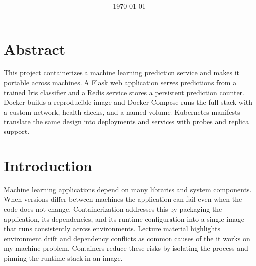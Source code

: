 \usepackage{listings}








\author[\lname]{\fname\ \lname \and \partner}
\date{\today}
\title[\assgn]{\assgn \\ \ \\\class}
\maketitle
\tableofcontents

\newpage

\section{Abstract}
This project containerizes a machine learning prediction service and makes it portable across machines. A Flask web application serves predictions from a trained Iris classifier and a Redis service stores a persistent prediction counter. Docker builds a reproducible image and Docker Compose runs the full stack with a custom network, health checks, and a named volume. Kubernetes manifests translate the same design into deployments and services with probes and replica support.

\section{Introduction}
Machine learning applications depend on many libraries and system components. When versions differ between machines the application can fail even when the code does not change. Containerization addresses this by packaging the application, its dependencies, and its runtime configuration into a single image that runs consistently across environments. Lecture material highlights environment drift and dependency conflicts as common causes of the it works on my machine problem. Containers reduce these risks by isolating the process and pinning the runtime stack in an image.

